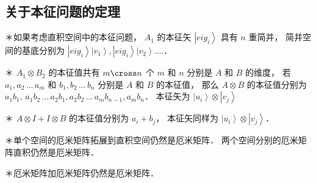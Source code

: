 \subsection{关于本征问题的定理}%
	
＊如果考虑直积空间中的本征问题， ${A_1}$  的本征矢 $\left| {ei{g_i}} \right\rangle $ 具有 $n$ 重简并， 简并空间的基底分别为 $\left| {ei{g_i}} \right\rangle \left| {{v_1}} \right\rangle ,\left| {ei{g_i}} \right\rangle \left| {{v_2}} \right\rangle ....$． 

＊ ${A_1} \otimes {B_2}$ 的本征值共有 $m \cross n$ 个 $m$ 和 $n$ 分别是 $A$ 和 $B$ 的维度， 若 ${a_1},{a_2}\,...\,{a_m}$ 和 ${b_1},{b_2}\,...\,{b_n}$ 分别是 $A$ 和 $B$ 的本征值， 那么 $A \otimes B$ 的本征值分别为 ${a_1}{b_1},\,{a_1}{b_2}\,...\,{a_2}{b_1},{a_2}{b_2}\,...\,{a_m}{b_{n - 1}},{a_m}{b_n}$．  本征矢为 $\left| {{u_i}} \right\rangle  \otimes \left| {{v_j}} \right\rangle $ 

＊ $A \otimes I + I \otimes B$ 的本征值分别为 ${a_i} + {b_j}$，  本征矢同样为 $\left| {{u_i}} \right\rangle  \otimes \left| {{v_j}} \right\rangle $． 

＊单个空间的厄米矩阵拓展到直积空间仍然是厄米矩阵． 两个空间分别的厄米矩阵直积仍然是厄米矩阵． 

＊厄米矩阵加厄米矩阵仍然是厄米矩阵．

